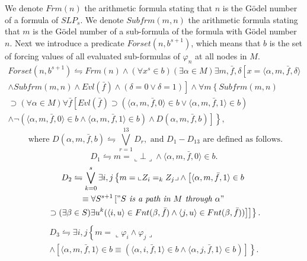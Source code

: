 \documentclass{asl}
\theoremstyle{definition}
\begin{document}
We denote $Frm(n)$ the arithmetic formula stating that $n$ is the G\"{o}del number of a formula of $SLP_s$. We denote $Subfrm(m,n)$ the arithmetic formula stating that $m$ is the G\"{o}del number of a sub-formula of the formula with G\"{o}del number $n$. Next we introduce a predicate $Forset(n,b^{s+1})$, which means that $b$ is the set of forcing values of all evaluated sub-formulas of $\varphi_n$ at all nodes in $M$.
\begin{multline*}
Forset(n,b^{s+1})\leftrightharpoons Frm(n)\wedge(\forall x^s\in b)(\exists\alpha\in M)\exists m,\bar{f},\delta\left[x=\langle\alpha,m,\bar{f},\delta\rangle
\right.
\\
\left.
\wedge Subfrm(m,n)\wedge Evl(\bar{f})\wedge(\delta=0\vee\delta=1)\right]
\wedge\forall m\left\lbrace Subfrm(m,n)
\right.
\\
\left.
\supset(\forall\alpha\in M)\forall\bar{f}\left[ Evl(\bar{f}) 
\supset(\langle\alpha,m,\bar{f},0\rangle\in b\vee \langle\alpha,m,\bar{f},1\rangle\in b)
\right.
\right.
\\
\left.
\left.
\wedge \neg(\langle\alpha,m,\bar{f},0\rangle\in b\wedge \langle\alpha,m,\bar{f},1\rangle\in b)\wedge 
D(\alpha,m,\bar{f},b)\right] \right\rbrace ,
\end{multline*}
\[\text{ where } D(\alpha,m,\bar{f},b)\leftrightharpoons \bigvee_{r=1}^{13}D_r, 
\text{ and }D_1 - D_{13}\text{ are defined as follows.}\]
\[D_1\leftrightharpoons m=\llcorner\bot\lrcorner \wedge \langle \alpha,m,\bar{f},0\rangle \in b.\]
\begin{multline*}
D_2\leftrightharpoons \bigvee_{k=0}^s \exists i,j \left\lbrace m=\llcorner Z_i=_k Z_j\lrcorner \wedge 
\left[\langle\alpha, m,\bar{f},1\rangle \in b 
\right.
\right.
\\
\left.
\left.
\equiv 
\forall S^{s+1}\left["S\textit{ is a path in }M\textit{ through }\alpha" 
\right.
\right.
\right.
\\
\left.
\left.
\left.
\supset(\exists\beta\in S)\exists u^k(\langle i,u\rangle\in Fnt(\beta,\bar{f})\wedge\langle j,u\rangle\in Fnt(\beta,\bar{f}))\right] 
\right]\right\rbrace. 
\end{multline*}
\begin{multline*}
D_3\leftrightharpoons \exists i,j\left\lbrace m=\llcorner \varphi_i \wedge \varphi_j\lrcorner 
\right.
\\
\left.
\wedge \left[\langle\alpha, m,\bar{f},1\rangle \in b \equiv \left(\langle \alpha,i,\bar{f},1\rangle \in b \wedge \langle\alpha, j,\bar{f},1\rangle \in b \right)  \right] 
\right\rbrace. 
\end{multline*}
\end{document}
